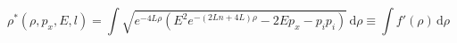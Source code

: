 \begin{equation}
\label{geodesic}
\rho^*(\rho, p_x,E,l)=\int
\sqrt{e^{-4L\rho}(E^2e^{-(2Ln+4L)\rho}-2Ep_x-p_ip_i)}\, \textrm{d}\rho \equiv \int
f'(\rho)\,\textrm{d}\rho
\end{equation}

